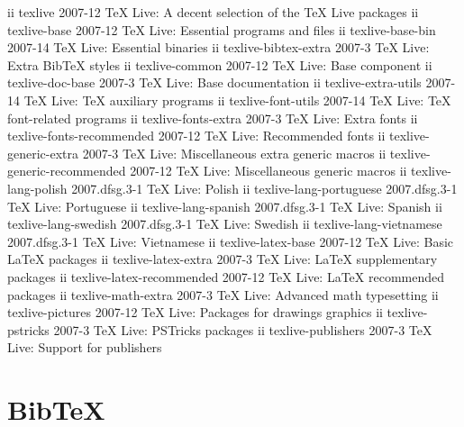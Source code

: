 \documentclass[12pt,brazil]{book}
\begin{document}
ii  texlive                              2007-12                     TeX Live: A decent selection of the TeX Live packages
ii  texlive-base                         2007-12                     TeX Live: Essential programs and files
ii  texlive-base-bin                     2007-14                     TeX Live: Essential binaries
ii  texlive-bibtex-extra                 2007-3                      TeX Live: Extra BibTeX styles
ii  texlive-common                       2007-12                     TeX Live: Base component
ii  texlive-doc-base                     2007-3                      TeX Live: Base documentation
ii  texlive-extra-utils                  2007-14                     TeX Live: TeX auxiliary programs
ii  texlive-font-utils                   2007-14                     TeX Live: TeX font-related programs
ii  texlive-fonts-extra                  2007-3                      TeX Live: Extra fonts
ii  texlive-fonts-recommended            2007-12                     TeX Live: Recommended fonts
ii  texlive-generic-extra                2007-3                      TeX Live: Miscellaneous extra generic macros
ii  texlive-generic-recommended          2007-12                     TeX Live: Miscellaneous generic macros
ii  texlive-lang-polish                  2007.dfsg.3-1               TeX Live: Polish
ii  texlive-lang-portuguese              2007.dfsg.3-1               TeX Live: Portuguese
ii  texlive-lang-spanish                 2007.dfsg.3-1               TeX Live: Spanish
ii  texlive-lang-swedish                 2007.dfsg.3-1               TeX Live: Swedish
ii  texlive-lang-vietnamese              2007.dfsg.3-1               TeX Live: Vietnamese
ii  texlive-latex-base                   2007-12                     TeX Live: Basic LaTeX packages
ii  texlive-latex-extra                  2007-3                      TeX Live: LaTeX supplementary packages
ii  texlive-latex-recommended            2007-12                     TeX Live: LaTeX recommended packages
ii  texlive-math-extra                   2007-3                      TeX Live: Advanced math typesetting
ii  texlive-pictures                     2007-12                     TeX Live: Packages for drawings graphics
ii  texlive-pstricks                     2007-3                      TeX Live: PSTricks packages
ii  texlive-publishers                   2007-3                      TeX Live: Support for publishers


\chapter{BibTeX}
\label{cha:bibtex}
\end{document}
